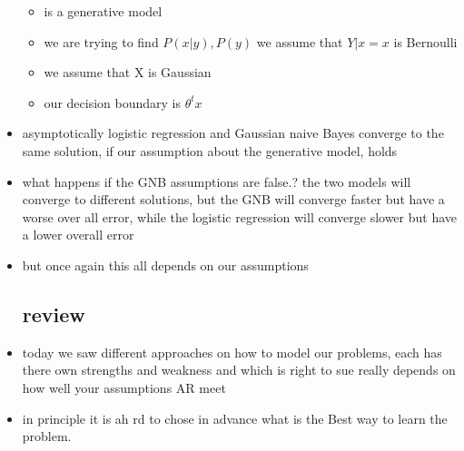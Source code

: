 \documentclass{article}
\begin{document}
\begin{itemize}
\begin{itemize}
    \item is a generative model 
    \item we are trying to find $P(x|y), P(y)$
    \tiem we assume that $Y|x=x$ is Bernoulli
    \item we assume that X is Gaussian 
    \item our decision boundary is $\theta^tx$
\end{itemize}
\item asymptotically logistic regression and Gaussian naive Bayes converge to the same solution, if our assumption about the generative model, holds
\item what happens if the GNB assumptions are false.? the two models will converge to different solutions, but the GNB will converge faster but have a worse over all error, while the logistic regression will converge slower but have a lower overall error

\item but once again this all depends on our assumptions 
\subsection{review}
\item today we saw different approaches on how to model our problems, each has there own strengths and weakness and which is right to sue really depends on how well your assumptions AR meet 
\item in principle it is ah rd to chose in advance what is the Best way to learn the problem. 

\end{itemize}
\end{document}
